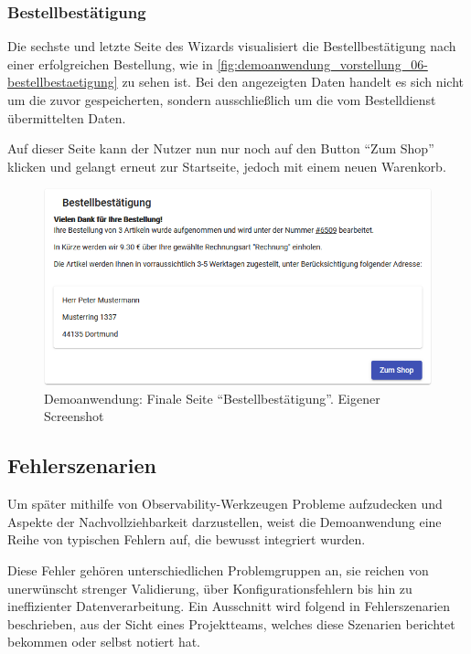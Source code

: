 \subsubsection{Bestellbestätigung}

Die sechste und letzte Seite des Wizards visualisiert die Bestellbestätigung nach einer erfolgreichen Bestellung, wie in \autoref{fig:demoanwendung_vorstellung_06-bestellbestaetigung} zu sehen ist. Bei den angezeigten Daten handelt es sich nicht um die zuvor gespeicherten, sondern ausschließlich um die vom Bestelldienst übermittelten Daten.

Auf dieser Seite kann der Nutzer nun nur noch auf den Button \enquote{Zum Shop} klicken und gelangt erneut zur Startseite, jedoch mit einem neuen Warenkorb.

\begin{figure}[H]
	\centering
	\includegraphics[width=0.75\linewidth]{img/04_erstellung-poc/demoanwendung_vorstellung_06-bestellbestaetigung.png}
	\caption{Demoanwendung: Finale Seite \enquote{Bestellbestätigung}. Eigener Screenshot}
	\label{fig:demoanwendung_vorstellung_06-bestellbestaetigung}
\end{figure}

\subsection{Fehlerszenarien}
\label{subsec:fehlerszenarien}

Um später mithilfe von Observability-Werkzeugen Probleme aufzudecken und Aspekte der Nachvollziehbarkeit darzustellen, weist die Demoanwendung eine Reihe von typischen Fehlern auf, die bewusst integriert wurden.

Diese Fehler gehören unterschiedlichen Problemgruppen an, sie reichen von unerwünscht strenger Validierung, über Konfigurationsfehlern bis hin zu ineffizienter Datenverarbeitung. Ein Ausschnitt wird folgend in Fehlerszenarien beschrieben, aus der Sicht eines Projektteams, welches diese Szenarien berichtet bekommen oder selbst notiert hat.

